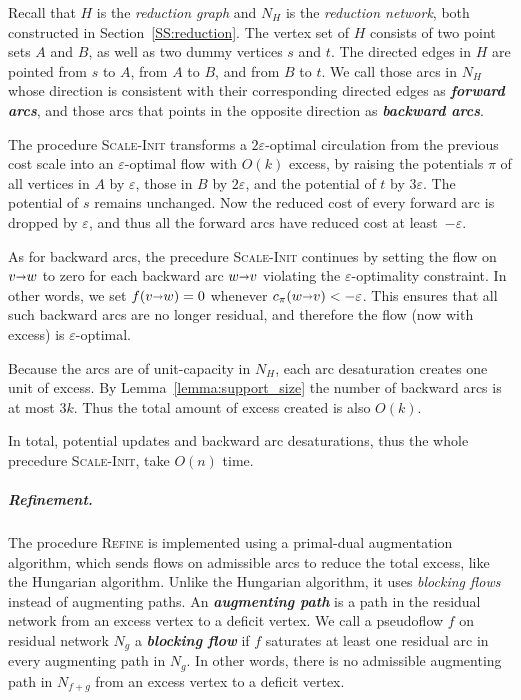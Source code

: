 \documentclass[a4paper,UKenglish]{socg-lipics-v2018}
\def\eps{\varepsilon}
\def\arcto{\mathord\shortrightarrow}
\def\arc#1#2{#1\arcto#2}
\theoremstyle{plain}
\numberwithin{figure}{section}
\renewcommand{\paragraph}{\subparagraph}
\def\EMPH#1{\textbf{\emph{\boldmath #1}}}
\begin{document}
Recall that $H$ is the \emph{reduction graph} and $N_H$ is the \emph{reduction network}, both constructed in Section~\ref{SS:reduction}.  The vertex set of $H$ consists of two point sets $A$ and $B$, as well as two dummy vertices $s$ and $t$.  The directed edges in $H$ are pointed from $s$ to $A$, from $A$ to $B$, and from $B$ to $t$.  We call those arcs in $N_H$ whose direction is consistent with their corresponding directed edges as \EMPH{forward arcs}, and those arcs that points in the opposite direction as \EMPH{backward arcs}.

The procedure \textsc{Scale-Init} transforms a $2\eps$-optimal circulation from the previous cost scale into an $\eps$-optimal flow with $O(k)$ excess, by raising the potentials $\pi$ of all vertices in $A$ by $\eps$, those in $B$ by $2\eps$, and the potential of $t$ by $3\eps$.  The potential of $s$ remains unchanged.
%
Now the reduced cost of every forward arc is dropped by $\eps$, and thus all the forward arcs have reduced cost at least~$-\eps$.

As for backward arcs, the precedure \textsc{Scale-Init} continues by setting the flow on $\arc vw$ to zero for each backward arc $\arc wv$ violating the $\eps$-optimality constraint.  In other words, we set $f(\arc vw) = 0$ whenever $c_\pi(\arc wv) < -\eps$.  This ensures that all such backward arcs are no longer residual, and therefore the flow (now with excess) is $\eps$-optimal.

Because the arcs are of unit-capacity in $N_H$, each arc desaturation creates one unit of excess.
By Lemma~\ref{lemma:support_size} the number of backward arcs is at most $3k$.
Thus the total amount of excess created is also $O(k)$.

In total, potential updates and backward arc desaturations, thus the whole precedure \textsc{Scale-Init}, take $O(n)$ time.


\paragraph{Refinement.}

The procedure \textsc{Refine} is implemented using a primal-dual augmentation algorithm,
which sends flows on admissible arcs to reduce the total excess, like the Hungarian algorithm.
Unlike the Hungarian algorithm,
it uses \emph{blocking flows} instead of augmenting paths.
%
An \EMPH{augmenting path} is a path in the residual network from an excess vertex to a deficit vertex.
We call a pseudoflow $f$ on residual network $N_g$ a \EMPH{blocking flow} if $f$ saturates at least one residual arc in every augmenting path in $N_g$.
In other words, there is no admissible augmenting path in $N_{f+g}$ from an excess vertex to a deficit vertex.
\end{document}
